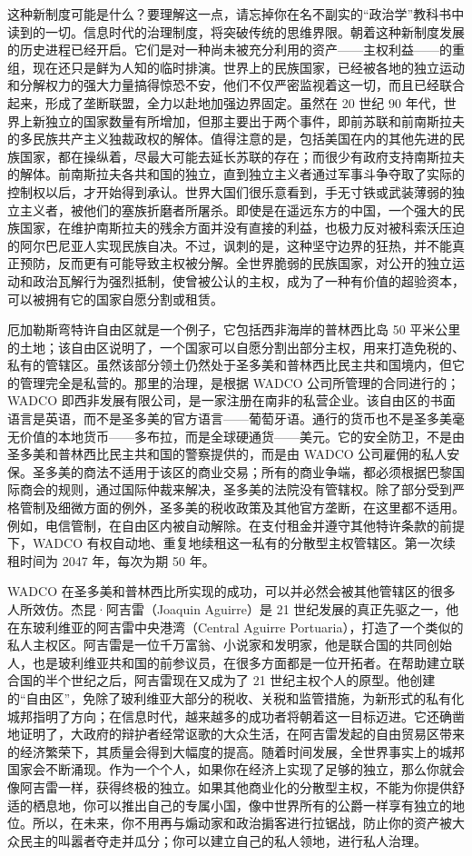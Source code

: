 这种新制度可能是什么？要理解这一点，请忘掉你在名不副实的“政治学”教科书中读到的一切。信息时代的治理制度，将突破传统的思维界限。朝着这种新制度发展的历史进程已经开启。它们是对一种尚未被充分利用的资产——主权利益——的重组，现在还只是鲜为人知的临时排演。世界上的民族国家，已经被各地的独立运动和分解权力的强大力量搞得惊恐不安，他们不仅严密监视着这一切，而且已经联合起来，形成了垄断联盟，全力以赴地加强边界固定。虽然在 20 世纪 90 年代，世界上新独立的国家数量有所增加，但那主要出于两个事件，即前苏联和前南斯拉夫的多民族共产主义独裁政权的解体。值得注意的是，包括美国在内的其他先进的民族国家，都在操纵着，尽最大可能去延长苏联的存在；而很少有政府支持南斯拉夫的解体。前南斯拉夫各共和国的独立，直到独立主义者通过军事斗争夺取了实际的控制权以后，才开始得到承认。世界大国们很乐意看到，手无寸铁或武装薄弱的独立主义者，被他们的塞族折磨者所屠杀。即使是在遥远东方的中国，一个强大的民族国家，在维护南斯拉夫的残余方面并没有直接的利益，也极力反对被科索沃压迫的阿尔巴尼亚人实现民族自决。不过，讽刺的是，这种坚守边界的狂热，并不能真正预防，反而更有可能导致主权被分解。全世界脆弱的民族国家，对公开的独立运动和政治瓦解行为强烈抵制，使曾被公认的主权，成为了一种有价值的超验资本，可以被拥有它的国家自愿分割或租赁。

厄加勒斯弯特许自由区就是一个例子，它包括西非海岸的普林西比岛 50 平米公里的土地；该自由区说明了，一个国家可以自愿分割出部分主权，用来打造免税的、私有的管辖区。虽然该部分领土仍然处于圣多美和普林西比民主共和国境内，但它的管理完全是私营的。那里的治理，是根据 WADCO 公司所管理的合同进行的；WADCO 即西非发展有限公司，是一家注册在南非的私营企业。该自由区的书面语言是英语，而不是圣多美的官方语言——葡萄牙语。通行的货币也不是圣多美毫无价值的本地货币——多布拉，而是全球硬通货——美元。它的安全防卫，不是由圣多美和普林西比民主共和国的警察提供的，而是由 WADCO 公司雇佣的私人安保。圣多美的商法不适用于该区的商业交易；所有的商业争端，都必须根据巴黎国际商会的规则，通过国际仲裁来解决，圣多美的法院没有管辖权。除了部分受到严格管制及细微方面的例外，圣多美的税收政策及其他官方垄断，在这里都不适用。例如，电信管制，在自由区内被自动解除。在支付租金并遵守其他特许条款的前提下，WADCO 有权自动地、重复地续租这一私有的分散型主权管辖区。第一次续租时间为 2047 年，每次为期 50 年。

WADCO 在圣多美和普林西比所实现的成功，可以并必然会被其他管辖区的很多人所效仿。杰昆·阿吉雷（Joaquin Aguirre）是 21 世纪发展的真正先驱之一，他在东玻利维亚的阿吉雷中央港湾（Central Aguirre Portuaria），打造了一个类似的私人主权区。阿吉雷是一位千万富翁、小说家和发明家，他是联合国的共同创始人，也是玻利维亚共和国的前参议员，在很多方面都是一位开拓者。在帮助建立联合国的半个世纪之后，阿吉雷现在又成为了 21 世纪主权个人的原型。他创建的“自由区”，免除了玻利维亚大部分的税收、关税和监管措施，为新形式的私有化城邦指明了方向；在信息时代，越来越多的成功者将朝着这一目标迈进。它还确凿地证明了，大政府的辩护者经常讴歌的大众生活，在阿吉雷发起的自由贸易区带来的经济繁荣下，其质量会得到大幅度的提高。随着时间发展，全世界事实上的城邦国家会不断涌现。作为一个个人，如果你在经济上实现了足够的独立，那么你就会像阿吉雷一样，获得终极的独立。如果其他商业化的分散型主权，不能为你提供舒适的栖息地，你可以推出自己的专属小国，像中世界所有的公爵一样享有独立的地位。所以，在未来，你不用再与煽动家和政治掮客进行拉锯战，防止你的资产被大众民主的叫嚣者夺走并瓜分；你可以建立自己的私人领地，进行私人治理。

